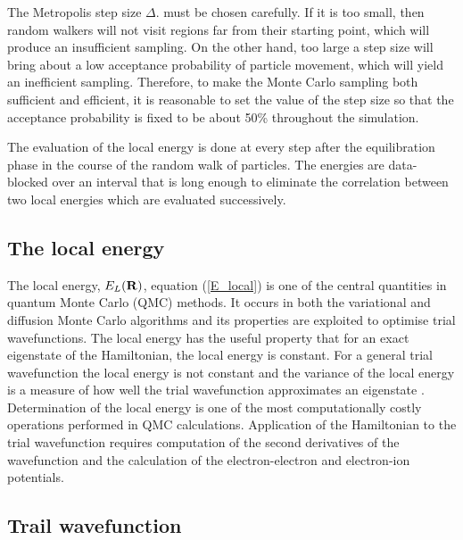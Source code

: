 \documentclass{article}
\begin{document}
The Metropolis step size $\Delta$. must be chosen carefully. If it is too small, then random walkers will not visit regions far from their starting point, which will produce an insufficient sampling. On the other hand, too large a step size will bring about a low acceptance probability of particle movement, which will yield an inefficient sampling. Therefore, to make the Monte Carlo sampling both sufficient and efficient, it is reasonable to set the value of the step size so that the acceptance probability is fixed to be about 50\% throughout the simulation.

The evaluation of the local energy is done at every step after the equilibration phase in the course of the random walk of particles. The energies are data-blocked over an interval that is long enough to eliminate the correlation between two local energies which are evaluated successively.


\subsection{The local energy}

The local energy,  $E_{L}({\bf R})$, equation (\ref{E_local}) is one of the central quantities in quantum Monte Carlo (QMC) methods. It occurs in both the variational and diffusion Monte Carlo algorithms and its properties are exploited to optimise trial wavefunctions. The local energy has the useful property that for an exact eigenstate of the Hamiltonian, the local energy is constant. For a general trial wavefunction the local energy is not constant and the variance of the local energy is a measure of how well the trial wavefunction approximates an eigenstate \citep{phd}. \\

Determination of the local energy is one of the most computationally costly operations performed in QMC calculations. Application of the Hamiltonian to the trial wavefunction requires computation of the second derivatives of the wavefunction and the calculation of the electron-electron and electron-ion potentials.

\subsection{Trail wavefunction}
\end{document}
